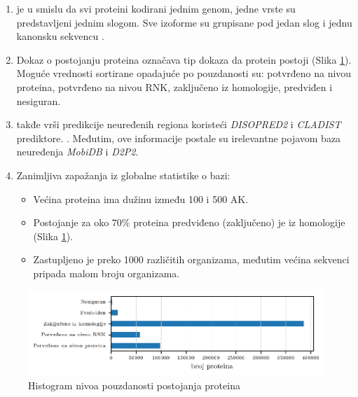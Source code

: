 \begin{enumerate}
  \item
    \label{red}
    \swissprot je  u smislu da svi proteini
    kodirani jednim genom, jedne vrste su predstavljeni jednim slogom. Sve
    izoforme su grupisane pod jedan slog i jednu kanonsku sekvencu \parencite{nonRedundant}.

  \item Dokaz o postojanju proteina   označava
    tip dokaza da protein postoji (Slika \ref{fig:PE}). Moguće vrednosti
    sortirane opadajuće po pouzdanosti su: potvrđeno na nivou proteina,
    potvrđeno na nivou RNK, zaključeno iz homologije, predviđen i nesiguran. 

  \clearpage


  \item
    \swissprot takđe vrši predikcije neuređenih regiona koristeći \textit{DISOPRED2}
    i \textit{CLADIST} prediktore. \parencite{Meng_c2017}. Međutim, ove informacije
    postale su irelevantne pojavom baza neuređenja \textit{MobiDB}\parencite{Piovesan2017} i \textit{D2P2}\parencite{Oates2012}.

  \item Zanimljiva zapažanja iz globalne statistike o \swissprot bazi:
    \begin{itemize}
      \item Većina proteina ima dužinu između 100 i 500 AK.
      \item Postojanje za oko $70\%$ proteina predviđeno (zaključeno) je iz
        homologije (Slika \ref{fig:PE}).
      \item Zastupljeno je preko 1000 različitih organizama, međutim
        većina \swissprot sekvenci pripada malom broju organizama.
    \end{itemize}
      


\end{enumerate}

\begin{figure}[h!]
  \centering
  \hspace*{-1cm} 
  \includegraphics[]{plots/PE.pdf}
  \caption{Histogram nivoa pouzdanosti postojanja \swissprot proteina}
  \label{fig:PE}
\end{figure}

%
%
%













